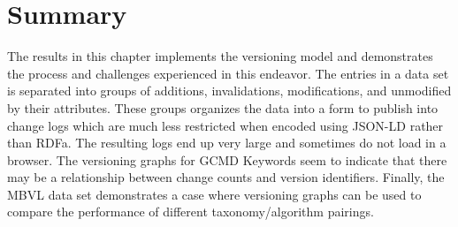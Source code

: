 \section{Summary}

The results in this chapter implements the versioning model and demonstrates the process and challenges experienced in this endeavor.
The entries in a data set is separated into groups of additions, invalidations, modifications, and unmodified by their attributes.
These groups organizes the data into a form to publish into change logs which are much less restricted when encoded using JSON-LD rather than RDFa.
The resulting logs end up very large and sometimes do not load in a browser.
The versioning graphs for GCMD Keywords seem to indicate that there may be a relationship between change counts and version identifiers.
Finally, the MBVL data set demonstrates a case where versioning graphs can be used to compare the performance of different taxonomy/algorithm pairings.